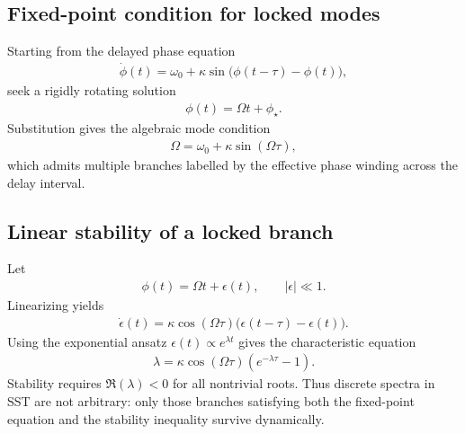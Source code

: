 \documentclass[11pt]{article}
\theoremstyle{definition}
\theoremstyle{plain}
\theoremstyle{remark}
\begin{document}
        \subsection{Fixed-point condition for locked modes}
            Starting from the delayed phase equation
            \begin{align}
                \dot{\phi}(t) = \omega_0 + \kappa \sin\big(\phi(t-\tau)-\phi(t)\big),
            \end{align}
            seek a rigidly rotating solution
            \begin{align}
                \phi(t)=\Omega t + \phi_\star.
            \end{align}
            Substitution gives the algebraic mode condition
            \begin{align}
                \Omega = \omega_0 + \kappa \sin(\Omega\tau),
            \end{align}
            which admits multiple branches labelled by the effective phase winding across the delay interval.

        \subsection{Linear stability of a locked branch}
            Let
            \begin{align}
                \phi(t) = \Omega t + \epsilon(t),
                \qquad |\epsilon|\ll 1.
            \end{align}
            Linearizing yields
            \begin{align}
                \dot{\epsilon}(t)
                =
                \kappa \cos(\Omega\tau)
                \big(\epsilon(t-\tau)-\epsilon(t)\big).
            \end{align}
            Using the exponential ansatz $\epsilon(t)\propto e^{\lambda t}$ gives the characteristic equation
            \begin{align}
                \lambda
                =
                \kappa \cos(\Omega\tau)
                \left(e^{-\lambda\tau}-1\right).
            \end{align}
            Stability requires $\Re(\lambda)<0$ for all nontrivial roots. Thus discrete spectra in SST are not arbitrary: only those branches satisfying both the fixed-point equation and the stability inequality survive dynamically.
\end{document}

